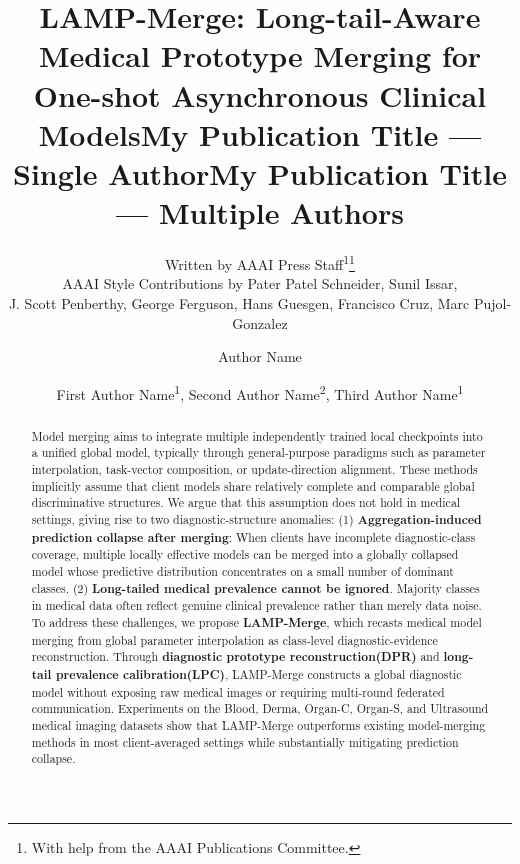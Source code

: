 \documentclass[letterpaper]{article} %
\title{LAMP-Merge: Long-tail-Aware Medical Prototype Merging for One-shot Asynchronous Clinical Models}
\author{
    Written by AAAI Press Staff\textsuperscript{\rm 1}\thanks{With help from the AAAI Publications Committee.}\\
    AAAI Style Contributions by Pater Patel Schneider,
    Sunil Issar,\\
    J. Scott Penberthy,
    George Ferguson,
    Hans Guesgen,
    Francisco Cruz\equalcontrib,
    Marc Pujol-Gonzalez\equalcontrib
}
\title{My Publication Title --- Single Author}
\author {
    Author Name
}
\title{My Publication Title --- Multiple Authors}
\author {
    First Author Name\textsuperscript{\rm 1},
    Second Author Name\textsuperscript{\rm 2},
    Third Author Name\textsuperscript{\rm 1}
}
\begin{document}
\maketitle

\begin{abstract}
Model merging aims to integrate multiple independently trained local checkpoints into a unified global model, typically through general-purpose paradigms such as parameter interpolation, task-vector composition, or update-direction alignment. These methods implicitly assume that client models share relatively complete and comparable global discriminative structures. We argue that this assumption does not hold in medical settings, giving rise to two diagnostic-structure anomalies: (1)\textbf{ Aggregation-induced prediction collapse after merging}: When clients have incomplete diagnostic-class coverage, multiple locally effective models can be merged into a globally collapsed model whose predictive distribution concentrates on a small number of dominant classes. (2)\textbf{ Long-tailed medical prevalence cannot be ignored}. Majority classes in medical data often reflect genuine clinical prevalence rather than merely data noise. To address these challenges, we propose \textbf{LAMP-Merge}, which recasts medical model merging from global parameter interpolation as class-level diagnostic-evidence reconstruction. Through \textbf{diagnostic prototype reconstruction(DPR)} and \textbf{long-tail prevalence calibration(LPC)}, LAMP-Merge constructs a global diagnostic model without exposing raw medical images or requiring multi-round federated communication. Experiments on the Blood, Derma, Organ-C, Organ-S, and Ultrasound medical imaging datasets show that LAMP-Merge outperforms existing model-merging methods in most client-averaged settings while substantially mitigating prediction collapse.

\end{abstract}


\end{document}
